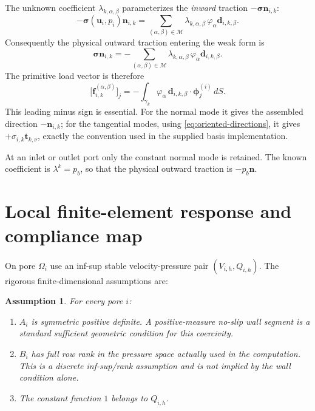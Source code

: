 \documentclass[11pt,a4paper]{article}
\newtheorem{assumption}{Assumption}
\newcommand{\pore}[1]{\Omega_{#1}}
\newcommand{\iface}{\gamma}
\newcommand{\vel}{\bm{u}}
\newcommand{\pres}{p}
\newcommand{\stress}{\bm{\sigma}}
\newcommand{\normal}{\bm{n}}
\newcommand{\modeset}{\mathcal{M}}
\newcommand{\loadvec}{\bm{f}}
\begin{document}
The unknown coefficient $\lambda_{k,\alpha,\beta}$ parameterizes the
\emph{inward} traction $-\stress\normal_{i,k}$:
\begin{equation}\label{eq:traction-ansatz}
 -\stress(\vel_i,\pres_i)\normal_{i,k}
 =\sum_{(\alpha,\beta)\in\modeset}
 \lambda_{k,\alpha,\beta}\,\varphi_\alpha\bm d_{i,k,\beta}.
\end{equation}
Consequently the physical outward traction entering the weak form is
\[
 \stress\normal_{i,k}
 =-\sum_{(\alpha,\beta)\in\modeset}
 \lambda_{k,\alpha,\beta}\,\varphi_\alpha\bm d_{i,k,\beta}.
\]
The primitive load vector is therefore
\begin{equation}\label{eq:primitive-load}
 \bigl[\loadvec_{i,k}^{(\alpha,\beta)}\bigr]_j
 =-\int_{\iface_k}\varphi_\alpha\,
 \bm d_{i,k,\beta}\cdot\bm\phi_j^{(i)}\,dS.
\end{equation}
This leading minus sign is essential.  For the normal mode it gives the
assembled direction $-\normal_{i,k}$; for the tangential modes, using
\eqref{eq:oriented-directions}, it gives
$+\sigma_{i,k}\bm t_{k,\nu}$, exactly the convention used in the supplied
basis implementation.

At an inlet or outlet port only the constant normal mode is retained.  The
known coefficient is $\lambda^k=p_b$, so that the physical outward traction
is $-p_b\normal$.

\section{Local finite-element response and compliance map}

On pore $\pore{i}$ use an inf-sup stable velocity-pressure pair
$(V_{i,h},Q_{i,h})$.  The rigorous finite-dimensional assumptions are:

\begin{assumption}\label{ass:local}
For every pore $i$:
\begin{enumerate}[nosep,leftmargin=*]
 \item $A_i$ is symmetric positive definite.  A positive-measure no-slip
 wall segment is a standard sufficient geometric condition for this
 coercivity.
 \item $B_i$ has full row rank in the pressure space actually used in the
 computation.  This is a discrete inf-sup/rank assumption and is not implied
 by the wall condition alone.
 \item The constant function $1$ belongs to $Q_{i,h}$.
\end{enumerate}
\end{assumption}
\end{document}
